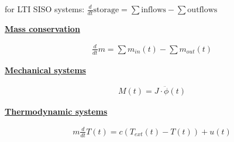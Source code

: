 for LTI SISO systems: $\frac{d}{dt} \text{storage} = \sum \text{inflows} - \sum \text{outflows}$

    \begin{center}
        \textbf{\underline{Mass conservation}}    
    \end{center}
    \begin{align*}
        \frac{d}{dt} m = \sum m_{in}(t) - \sum m_{out}(t)
    \end{align*}

    \begin{center}
        \textbf{\underline{Mechanical systems}}    
    \end{center}
    \begin{align*}
        M(t) = J \cdot \ddot{\phi}(t)
    \end{align*}

    \begin{center}
        \textbf{\underline{Thermodynamic systems}}    
    \end{center}
    \begin{align*}
        m \frac{d}{dt} T(t) = c(T_{ext}(t) -T(t)) + u(t)
    \end{align*}